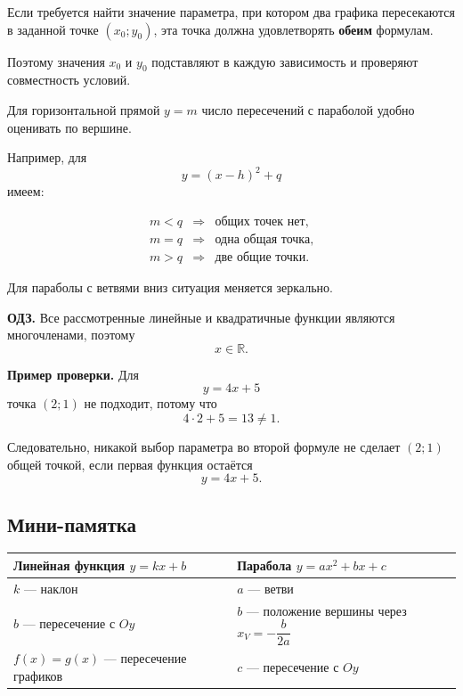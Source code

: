 \documentclass[a4paper,12pt]{article}
\begin{document}
Если требуется найти значение параметра, при котором два графика пересекаются
в заданной точке $(x_0;y_0)$, эта точка должна удовлетворять
\textbf{обеим} формулам.

Поэтому значения $x_0$ и $y_0$ подставляют в каждую зависимость
и проверяют совместность условий.

Для горизонтальной прямой $y=m$ число пересечений с параболой удобно оценивать
по вершине.

Например, для
\[
y=(x-h)^2+q
\]
имеем:

\[
\begin{array}{ccl}
m<q &\Longrightarrow& \text{общих точек нет},\\[1mm]
m=q &\Longrightarrow& \text{одна общая точка},\\[1mm]
m>q &\Longrightarrow& \text{две общие точки}.
\end{array}
\]

Для параболы с ветвями вниз ситуация меняется зеркально.

\textbf{ОДЗ.}
Все рассмотренные линейные и квадратичные функции являются многочленами,
поэтому
\[
x\in\mathbb{R}.
\]

\textbf{Пример проверки.}
Для
\[
y=4x+5
\]
точка $(2;1)$ не подходит, потому что
\[
4\cdot2+5=13\ne1.
\]

Следовательно, никакой выбор параметра во второй формуле не сделает
$(2;1)$ общей точкой, если первая функция остаётся
\[
y=4x+5.
\]

\subsection*{Мини-памятка}

\begin{center}
\begin{tabularx}{0.92\linewidth}{@{}X X@{}}
\toprule
\textbf{Линейная функция $y=kx+b$}
&
\textbf{Парабола $y=ax^2+bx+c$}
\\
\midrule
$k$ --- наклон
&
$a$ --- ветви
\\

$b$ --- пересечение с $Oy$
&
$b$ --- положение вершины через
$x_V=-\dfrac{b}{2a}$
\\

$f(x)=g(x)$ --- пересечение графиков
&
$c$ --- пересечение с $Oy$
\\
\bottomrule
\end{tabularx}
\end{center}

\end{document}
